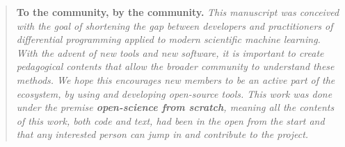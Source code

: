 
\begin{quote}
    \textbf{To the community, by the community.}
    \textit{This manuscript was conceived with the goal of shortening the gap between developers and practitioners of differential programming applied to  modern scientific machine learning. 
    With the advent of new tools and new software, it is important to create pedagogical contents that allow the broader community to understand these methods. 
    We hope this encourages new members to be an active part of the ecosystem, by using and developing open-source tools. 
    This work was done under the premise \textbf{open-science from scratch}, meaning all the contents of this work, both code and text, had been in the open from the start and that any interested person can jump in and contribute to the project. }
\end{quote}